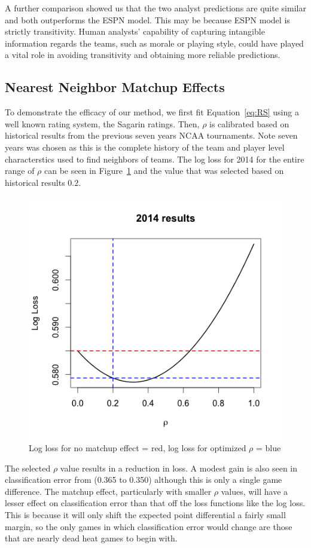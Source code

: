 A further comparison showed us that the two analyst predictions are quite similar and both outperforms the ESPN model. This may be because ESPN model is strictly transitivity. Human analysts' capability of capturing intangible information regards the teams, such as  morale or playing style, could have played a vital role in avoiding transitivity and obtaining more reliable predictions.         


\subsection{Nearest Neighbor Matchup Effects}
To demonstrate the efficacy of our method, we first fit Equation~\ref{eq:RS} using a well known rating system, the Sagarin ratings.  Then, $\rho$ is calibrated based on historical results from the previous seven years NCAA tournaments.  Note seven years was chosen as this is the complete history of the team and player level characterstics used to find neighbors of teams.   The log loss for 2014 for the entire range of $\rho$ can be seen in Figure~\ref{fig:result} and the value that was selected based on historical results $0.2$.
\begin{figure}[h!]
\centering
\includegraphics[width=.7\textwidth]{results_2014.png}
\caption{Log loss for no matchup effect = red, log loss for optimized $\rho$ = blue}
\label{fig:result}
\end{figure}

The selected $\rho$ value results in a reduction in loss.  A modest gain is also seen in classification error from (0.365 to 0.350) although this is only a single game difference.  The matchup effect, particularly with smaller $\rho$ values, will have a lesser effect on classification error than that off the loss functions like the log loss.  This is because it will only shift the expected point differential a fairly small margin, so the only games in which classification error would change are those that are nearly dead heat games to begin with.

